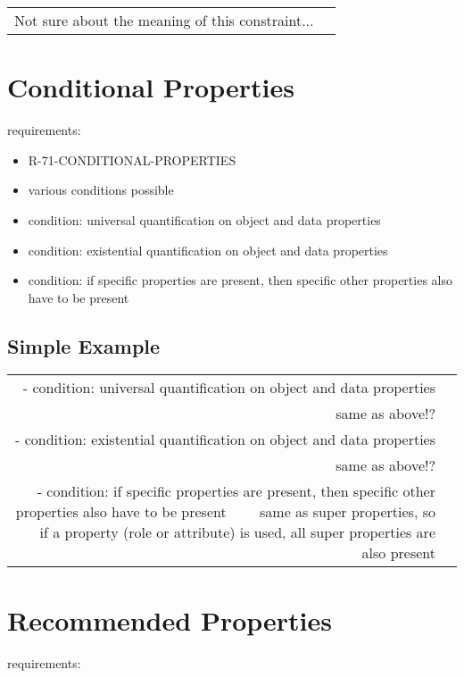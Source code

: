 \documentclass{llncs}
\newenvironment{DL}{
	\begin{center}
  \begin{tabular}{r l}

}{
  \end{tabular}
	\end{center}
}
\newcommand{\an}[1]{\todo[size=\small, color=green!40]{\textbf{Andy:} #1}}
\begin{document}
\begin{DL}
Not sure about the meaning of this constraint...
\end{DL}

\an{not sure!}

\section{Conditional Properties}

requirements:

\begin{itemize}
	\item R-71-CONDITIONAL-PROPERTIES
\end{itemize}



\begin{itemize}
	\item various conditions possible
  \item condition: universal quantification on object and data properties
  \item condition: existential quantification on object and data properties
  \item condition: if specific properties are present, then specific other properties also have to be present
\end{itemize}

\subsection{Simple Example}

\begin{DL}
- condition: universal quantification on object and data properties\\
\ \ \ \ same as above!?\\
- condition: existential quantification on object and data properties\\
\ \ \ \ same as above!?\\
- condition: if specific properties are present, then specific other properties also have to be present
\ \ \ \ same as super properties, so if a property (role or attribute) is used, all super properties are also present
\end{DL}

\section{Recommended Properties}

requirements:
\end{document}
